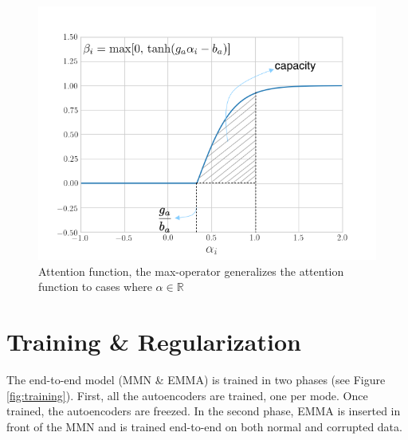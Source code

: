 \begin{figure}[!h]
\centering
\includegraphics[scale=0.5]{figures/tanh-annotated}
\caption[Attention function]{Attention function, the max-operator generalizes the attention function to cases where $\alpha \in \mathbb{R}$}
\label{fig:attention-function}
\end{figure}

\section{Training \& Regularization}\label{sec:regul}
The end-to-end model (MMN \& EMMA) is trained in two phases (see Figure \ref{fig:training}). First, all the autoencoders are trained, one per mode. Once trained, the autoencoders are freezed. In the second phase, EMMA is inserted in front of the MMN and is trained end-to-end on both normal and corrupted data.

